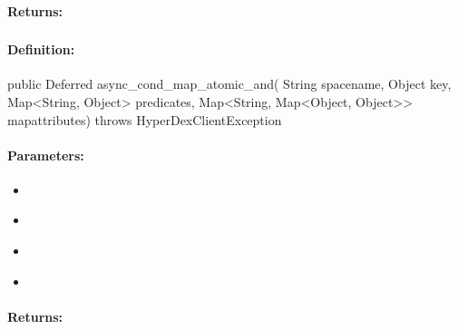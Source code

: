 \paragraph{Returns:}


\pagebreak
\subsubsection{}
\label{api:java:async_cond_map_atomic_and}


\paragraph{Definition:}
\begin{javacode}
public Deferred async_cond_map_atomic_and(
        String spacename,
        Object key,
        Map<String, Object> predicates,
        Map<String, Map<Object, Object>> mapattributes) throws HyperDexClientException
\end{javacode}

\paragraph{Parameters:}
\begin{itemize}[noitemsep]
\item {}\\

\item {}\\

\item {}\\

\item {}\\

\end{itemize}

\paragraph{Returns:}



